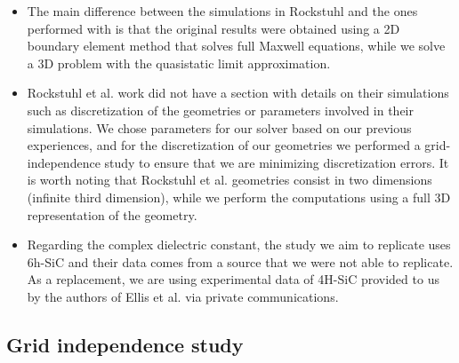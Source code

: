 \begin{itemize}

\item {The main difference between the simulations in Rockstuhl and the ones performed with \pygbe is that the original results were obtained 
using a 2D boundary element method that solves full Maxwell equations, while we solve a 3D problem with the quasistatic limit approximation.}

\item{Rockstuhl et al. work did not have a section with details on their simulations such as discretization of the geometries or parameters 
involved in their simulations. We chose parameters for our solver based on our previous experiences, and for the discretization of our 
geometries we performed a grid-independence study to ensure that we are minimizing discretization errors. It is worth noting that Rockstuhl
et al. geometries consist in two dimensions (infinite third dimension), while we perform the computations using a full 3D representation of the geometry.} 

\item {Regarding the complex dielectric constant, the study we aim to replicate uses 6h-SiC and their data comes from a source that we were not able
to replicate. As a replacement, we are using experimental data of 4H-SiC provided to us by the authors of Ellis et al. \cite{ellis2016} via 
private communications.}

\end{itemize}

\subsection{Grid independence study} \label{ssec:grid_indep_rock}

